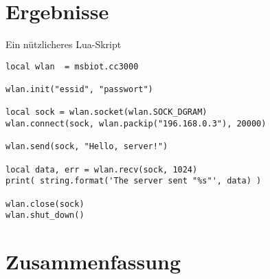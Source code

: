 \documentclass[xcolor=svgnames]{beamer}
\begin{document}
\section{Ergebnisse}

\begin{frame}[fragile]{Ein nützlicheres Lua-Skript}
\lstset{style=lualisting}
\begin{lstlisting}
local wlan  = msbiot.cc3000

wlan.init("essid", "passwort")

local sock = wlan.socket(wlan.SOCK_DGRAM)
wlan.connect(sock, wlan.packip("196.168.0.3"), 20000)

wlan.send(sock, "Hello, server!")

local data, err = wlan.recv(sock, 1024)
print( string.format('The server sent "%s"', data) )

wlan.close(sock)
wlan.shut_down()
\end{lstlisting}
\end{frame}

\section{Zusammenfassung}
\end{document}
